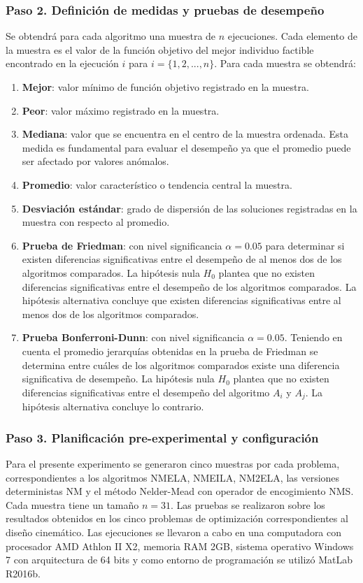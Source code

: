  \subsubsection{Paso 2. Definición de medidas y pruebas de desempeño}\label{sec:Definición de medidas Experimento C}
 Se obtendrá para cada algoritmo una muestra de $n$ ejecuciones. Cada elemento de la muestra es el valor de la función objetivo del mejor individuo factible encontrado en la ejecución $i$ para $i= \{ 1,2,...,n\}$. Para cada muestra se obtendrá:
 \begin{enumerate}
 	\item \textbf{Mejor}: valor mínimo de función objetivo registrado en la muestra.
 	\item \textbf{Peor}: valor máximo registrado en la muestra.
 	\item \textbf{Mediana}: valor que se encuentra en el centro de la muestra ordenada. Esta medida es fundamental para evaluar el desempeño ya que el promedio puede ser afectado por valores anómalos. 
 	\item \textbf{Promedio}: valor característico o tendencia central la muestra.
 	\item \textbf{Desviación estándar}: grado de dispersión de las soluciones registradas en la muestra con respecto al promedio.
 	\item \textbf{Prueba de Friedman}: con nivel significancia $\alpha=0.05$ para determinar si existen diferencias significativas entre el desempeño de al menos dos de los algoritmos comparados. La hipótesis nula $H_0$ plantea que no existen diferencias significativas entre el desempeño de los algoritmos comparados. La hipótesis alternativa concluye que existen diferencias significativas entre al menos dos de los algoritmos comparados. 
 	\item \textbf{Prueba Bonferroni-Dunn}: con nivel significancia $\alpha=0.05$. Teniendo en cuenta el promedio jerarquías obtenidas en la prueba de Friedman se determina entre cuáles de los algoritmos comparados existe una diferencia significativa de desempeño. La hipótesis nula $H_0$ plantea que no existen diferencias significativas entre el desempeño del algoritmo $A_i$ y $A_j$. La hipótesis alternativa concluye lo contrario.

 \end{enumerate}
 \subsubsection{Paso 3. Planificación pre-experimental y configuración}
 Para el presente experimento se generaron cinco muestras por cada problema, correspondientes a los algoritmos NMELA, NMEILA, NM2ELA, las versiones deterministas NM y el método Nelder-Mead con operador de encogimiento NMS. Cada muestra tiene un tamaño $n=31$. Las pruebas se realizaron sobre los resultados obtenidos en los cinco problemas de optimización correspondientes al diseño cinemático. Las ejecuciones se llevaron a cabo en una computadora con procesador AMD Athlon II X2, memoria RAM 2GB, sistema operativo Windows 7 con arquitectura de 64 bits y como entorno de programación se utilizó  MatLab R2016b. 
 
